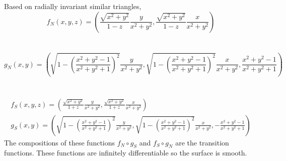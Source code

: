 \documentclass{jhwhw}
\begin{document}
\solution{}

\part{}%
Based on radially invariant similar triangles,
\begin{equation}
f_N(x,y,z) = \left(\frac{\sqrt{x^2+y^2}}{1-z}\frac{y}{x^2+y^2} , \frac{\sqrt{x^2+y^2}}{1-z}\frac{x}{x^2+y^2}\right)
\end{equation}

\part{}%
\begin{equation}
g_N(x,y) = \left(\sqrt{1-\left(\frac{x^2+y^2-1}{x^2+y^2+1}\right)^2}\frac{y}{x^2+y^2},\sqrt{1-\left(\frac{x^2+y^2-1}{x^2+y^2+1}\right)^2}\frac{x}{x^2+y^2},\frac{x^2+y^2-1}{x^2+y^2+1}\right)
\end{equation}
\part{}%
\begin{gather}
f_S(x,y,z) = \left(\frac{\sqrt{x^2+y^2}}{1+z}\frac{y}{x^2+y^2} , \frac{\sqrt{x^2+y^2}}{1+z}\frac{x}{x^2+y^2}\right)\\
g_S(x,y) = \left(\sqrt{1-\left(\frac{x^2+y^2-1}{x^2+y^2+1}\right)^2}\frac{y}{x^2+y^2},\sqrt{1-\left(\frac{x^2+y^2-1}{x^2+y^2+1}\right)^2}\frac{x}{x^2+y^2},-\frac{x^2+y^2-1}{x^2+y^2+1}\right)
\end{gather}
The compositions of these functions $f_N\circ g_S$ and $f_S\circ g_N$ are the transition functions. These functions are infinitely differentiable so the surface is smooth.
\end{document}
